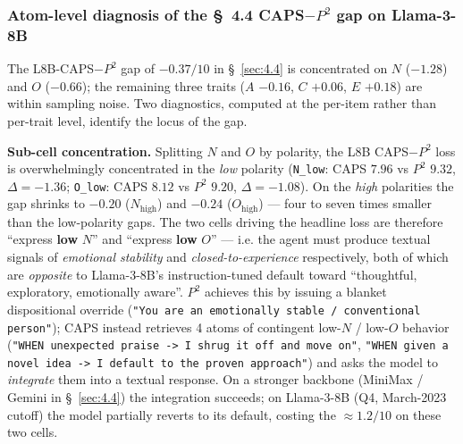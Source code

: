 \subsubsection{Atom-level diagnosis of the \S~4.4 CAPS$-$$P^{\!2}$ gap on Llama-3-8B}
\label{app:A.4.1}

The L8B-CAPS$-$$P^{\!2}$ gap of $-0.37/10$ in \S~\ref{sec:4.4} is concentrated on $N$ ($-1.28$) and $O$ ($-0.66$); the remaining three traits ($A$ $-0.16$, $C$ $+0.06$, $E$ $+0.18$) are within sampling noise. Two diagnostics, computed at the per-item rather than per-trait level, identify the locus of the gap.

\textbf{Sub-cell concentration.} Splitting $N$ and $O$ by polarity, the L8B CAPS$-$$P^{\!2}$ loss is overwhelmingly concentrated in the \textit{low} polarity (\texttt{N\_\allowbreak{}low}: CAPS $7.96$ vs $P^{\!2}$ $9.32$, $\Delta = -1.36$; \texttt{O\_\allowbreak{}low}: CAPS $8.12$ vs $P^{\!2}$ $9.20$, $\Delta = -1.08$). On the \textit{high} polarities the gap shrinks to $-0.20$ ($N_\text{high}$) and $-0.24$ ($O_\text{high}$) --- four to seven times smaller than the low-polarity gaps. The two cells driving the headline loss are therefore ``express \textbf{low} $N$'' and ``express \textbf{low} $O$'' --- i.e. the agent must produce textual signals of \textit{emotional stability} and \textit{closed-to-experience} respectively, both of which are \textit{opposite} to Llama-3-8B's instruction-tuned default toward ``thoughtful, exploratory, emotionally aware''. $P^{\!2}$ achieves this by issuing a blanket dispositional override (\texttt{"You are an emotionally stable /\allowbreak{} conventional person"}); CAPS instead retrieves 4 atoms of contingent low-$N$ / low-$O$ behavior (\texttt{"WHEN unexpected praise -> I shrug it off and move on"}, \texttt{"WHEN given a novel idea -> I default to the proven approach"}) and asks the model to \textit{integrate} them into a textual response. On a stronger backbone (MiniMax / Gemini in \S~\ref{sec:4.4}) the integration succeeds; on Llama-3-8B (Q4, March-2023 cutoff) the model partially reverts to its default, costing the $\approx 1.2/10$ on these two cells.

